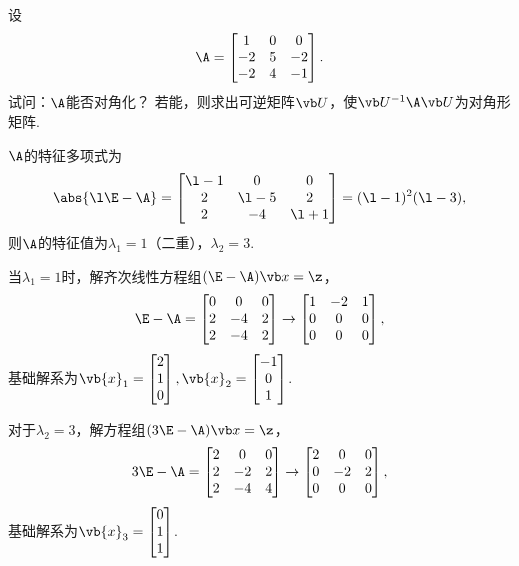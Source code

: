\begin{example}
设\[
	\A = \begin{bmatrix}
		1 & 0 & 0 \\
		-2 & 5 & -2 \\
		-2 & 4 & -1
	\end{bmatrix}.
\]
试问：\(\A\)能否对角化？
若能，则求出可逆矩阵\(\P\)，使\(\P^{-1}\A\P\)为对角形矩阵.
\begin{solution}
\(\A\)的特征多项式为\[
	\abs{\l\E-\A} = \begin{bmatrix}
		\l-1 & 0 & 0 \\
		2 & \l-5 & 2 \\
		2 & -4 & \l+1
	\end{bmatrix}
	= (\l-1)^2 (\l-3),
\]
则\(\A\)的特征值为\(\lambda_1=1\)（二重），\(\lambda_2=3\).

当\(\lambda_1=1\)时，解齐次线性方程组\((\E-\A)\x=\z\)，\[
	\E-\A=\begin{bmatrix}
		0 & 0 & 0 \\
		2 & -4 & 2 \\
		2 & -4 & 2
	\end{bmatrix}
	\to \begin{bmatrix}
		1 & -2 & 1 \\
		0 & 0 & 0 \\
		0 & 0 & 0
	\end{bmatrix},
\]
基础解系为\(\vb{x}_1 = \begin{bmatrix} 2 \\ 1 \\ 0 \end{bmatrix},
\vb{x}_2 = \begin{bmatrix} -1 \\ 0 \\ 1 \end{bmatrix}\).

对于\(\lambda_2=3\)，解方程组\((3\E-\A)\x=\z\)，\[
	3\E-\A=\begin{bmatrix}
		2 & 0 & 0 \\
		2 & -2 & 2 \\
		2 & -4 & 4
	\end{bmatrix} \to \begin{bmatrix}
		2 & 0 & 0 \\
		0 & -2 & 2 \\
		0 & 0 & 0
	\end{bmatrix},
\]
基础解系为\(\vb{x}_3 = \begin{bmatrix} 0 \\ 1 \\ 1 \end{bmatrix}\).


\end{solution}
\end{example}
